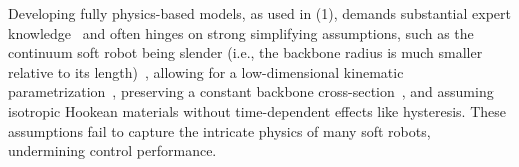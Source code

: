 Developing fully physics-based models, as used in (1), demands substantial expert knowledge~\citep{stella2023science} and often hinges on strong simplifying assumptions, such as the continuum soft robot being slender (i.e., the backbone radius is much smaller relative to its length)~\citep{cosserat1909theorie}, allowing for a low-dimensional kinematic parametrization~\citep{armanini2023soft}, preserving a constant backbone cross-section~\citep{gazzola2018forward}, and assuming isotropic Hookean materials without time-dependent effects like hysteresis. These assumptions fail to capture the intricate physics of many soft robots, undermining control performance. 
